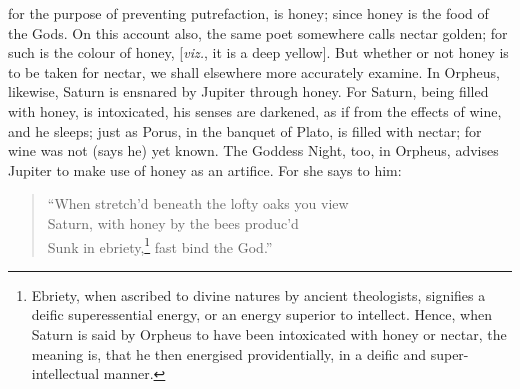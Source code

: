 \documentclass[12pt]{article}
\begin{document}
for the purpose of preventing putrefaction, is honey; since honey is the food
of the Gods. On this account also, the same poet somewhere calls nectar golden;
for such is the colour of honey, [\textit{viz.}, it is a deep yellow]. But
whether or not honey is to be taken for nectar, we shall elsewhere more
accurately examine. In Orpheus, likewise, Saturn is ensnared by Jupiter through
honey. For Saturn, being filled with honey, is intoxicated, his senses are
darkened, as if from the effects of wine, and he sleeps; just as Porus, in the
banquet of Plato, is filled with nectar; for wine was not (says he) yet known.
The Goddess Night, too, in Orpheus, advises Jupiter to make use of honey as an
artifice. For she says to him:

\begin{verse}
``When stretch'd beneath the lofty oaks you view\\
Saturn, with honey by the bees produc'd\\
Sunk in ebriety,\footnote{Ebriety, when ascribed to divine natures by ancient
theologists, signifies a deific superessential energy, or an energy superior to
intellect. Hence, when Saturn is said by Orpheus to have been intoxicated with
honey or nectar, the meaning is, that he then energised providentially, in a
deific and super-intellectual manner.} fast bind the God.''
\end{verse}
\end{document}
